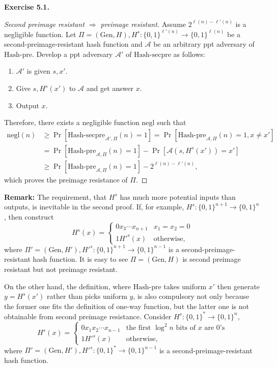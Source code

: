 \documentclass[a4paper]{article}
\newtheorem*{proof}{Proof}
\newenvironment{exercise}[1]{
	\par
	\noindent\textbf{Exercise #1.}\quad
}{
	\par
	\bigskip
}
\newcommand{\sbra}[1]{\left[ #1 \right]}
\newcommand{\bin}{\{0,1\}}
\newcommand{\Gen}{\mathrm{Gen}}
\newcommand{\negl}{\mathrm{negl}}
\newcommand{\ppt}{{\sc ppt} }
\newcommand{\Acal}{\mathcal{A}}
\begin{document}
\begin{exercise}{5.1}
\begin{proof}[Second preimage resistant $\Rightarrow$ preimage resistant]
    Assume $2^{\ell(n)-\ell'(n)}$ is a negligible function.
    Let $\Pi=(\Gen,H),H^s:\bin^{\ell'(n)}\to\bin^{\ell(n)}$ be a second-preimage-resistant hash function and 
    $\Acal$ be an arbitrary \ppt adversary of $\mathrm{Hash\text{-}pre}$.
    Develop a \ppt adversary $\Acal'$ of $\mathrm{Hash\text{-}secpre}$ as follows:
    \begin{enumerate}
        \item $\Acal'$ is given $s,x'$. 
        \item Give $s,H^s(x')$ to $\Acal$ and get answer $x$.
        \item Output $x$.
    \end{enumerate}
    Therefore, there exists a negligible function $\negl$ such that
    \begin{align*}
        \negl(n)&\geq
        \Pr\sbra{\mathrm{Hash\text{-}secpre}_{\Acal',\Pi}(n)=1}=
        \Pr\sbra{\mathrm{Hash\text{-}pre}_{\Acal,\Pi}(n)=1,x\neq x'}\\
        &=\Pr\sbra{\mathrm{Hash\text{-}pre}_{\Acal,\Pi}(n)=1}-\Pr\sbra{\Acal(s,H^s(x'))=x'}\\
        &\geq\Pr\sbra{\mathrm{Hash\text{-}pre}_{\Acal,\Pi}(n)=1}-2^{\ell(n)-\ell'(n)},
    \end{align*}
    which proves the preimage resistance of $\Pi$.
\end{proof}

\noindent\textbf{Remark:} The requirement, that $H^s$ has much more potential inputs than outputs, 
is inevitable in the second proof. If,
for example, $H^s:\bin^{n+1}\to\bin^{n}$, then construct 
$$
H^s(x)=\begin{cases}
    0x_3\cdots x_{n+1} & x_1=x_2=0\\
    1H'^s(x) & \text{otherwise},
\end{cases}
$$
where $\Pi'=(\Gen,H'),H'^s:\bin^{n+1}\to\bin^{n-1}$ is a second-preimage-resistant hash function.
It is easy to see $\Pi=(\Gen,H)$ is second preimage resistant but not preimage resistant.

On the other hand, the definition, where $\mathrm{Hash\text{-}pre}$ takes uniform $x'$ then generate $y=H^s(x')$ 
rather than picks uniform $y$, is also compulsory not only because the former one fits the definition of one-way function,
but the latter one is not obtainable from second preimage resistance. Consider $H^s:\bin^*\to\bin^n$,
$$
H^s(x)=\begin{cases}
    0x_1x_2\cdots x_{n-1} & \text{the first $\log^2 n$ bits of $x$ are $0$'s}\\
    1H'^s(x) & \text{otherwise},
\end{cases}
$$
where $\Pi'=(\Gen,H'),H'^s:\bin^*\to\bin^{n-1}$ is a second-preimage-resistant hash function.

\end{exercise}
\end{document}
